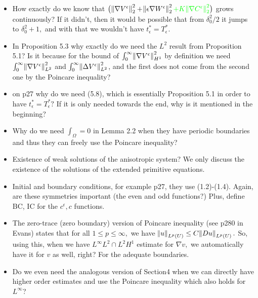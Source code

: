 \documentclass[11pt]{article}
\begin{document}
\begin{itemize}
    \item How exactly do we know that $\big (\norm{\nabla V^\epsilon}^2_2 + \norm{\epsilon \nabla W^\epsilon}^2_2 \textcolor{green}{+ K \norm{\nabla C^\epsilon}^2_2} \big )$ grows continuously? If it didn't, then it would be possible that from $\delta_0^2 / 2$ it jumps to $\delta_0^2 +1,$ and with that we wouldn't have $t^*_\epsilon = T^*_\epsilon.$
  
  \item In Proposition 5.3 why exactly do we need the $L^2$ result from Proposition 5.1? Is it because for the bound of $\int_0^\infty \norm{\nabla V^\epsilon}^2_{H^1}$ by definition we need $\int_0^\infty \norm{\nabla V^\epsilon}^2_{L^2}$ and $\int_0^\infty \norm{\Delta V^\epsilon}^2_{L^2}$, and the first does not come from the second one by the Poincare inequality?
  
  \item on p27 why do we need (5.8), which is essentially Proposition 5.1 in order to have $t^*_\epsilon = T^*_\epsilon?$ If it is only needed towards the end, why is it mentioned in the beginning?

  \item Why do we need $\int_\Omega = 0$ in Lemma 2.2 when they have periodic boundaries and thus they can freely use the Poincare inequality?
  
  \item Existence of weak solutions of the anisotropic system? We only discuss the existence of the solutions of the extended primitive equations.

  \item Initial and boundary conditions, for example p27, they use (1.2)-(1.4). Again, are these symmetries important (the even and odd functions?) Plus, define BC, IC for the $c^\epsilon, c$ functions.
  
  \item The zero-trace (zero boundary) version of Poincare inequality (see p280 in Evans) states that for all $1 \leq p \leq \infty,$ we have $\norm{u}_{L^p(U)} \leq C \norm{D u}_{L^p (U)}.$ So, using this, when we have $L^\infty L^2 \cap L^2 H^1$ estimate for $\nabla v,$ we automatically have it for $v$ as well, right? For the adequate boundaries.
  
  \item Do we even need the analogous version of Section4 when we can directly have higher order estimates and use the Poincare inequality which also holds for $L^\infty$?

\end{itemize}
\end{document}
